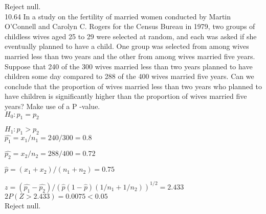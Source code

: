 Reject null. \\


10.64 In a study on the fertility of married women conducted by Martin O’Connell and Carolyn C. Rogers for the Census Bureau in 1979, two groups of childless wives aged 25 to 29 were selected at random, and each was asked if she eventually planned to have a child. One group was selected from among wives married less than two years and the other from among wives married five years. Suppose that 240 of the 300 wives married less than two years planned to have children some day compared to 288 of the 400 wives married five years. Can we conclude that the proportion of wives married less than two years who planned to have children is significantly higher than the proportion of wives married five years? Make use of a P -value. \\

$H_0 : p_1 = p_2$

$H_1 : p_1 > p_2$ \\

$\hat{p_1} = x_1/n_1 = 240/300 = 0.8$

$\hat{p_2} = x_2/n_2 = 288/400 = 0.72$

$\hat{p} = (x_1 + x_2)/(n_1 + n_2) = $$0.75$

$z = (\hat{p_1} - \hat{p_2})/(\hat{p}(1 - \hat{p})(1/n_1 + 1/n_2))^{1/2}$$=2.433$ \\

$2P(Z > 2.433) = 0.0075 < 0.05$  \\

Reject null. \\



